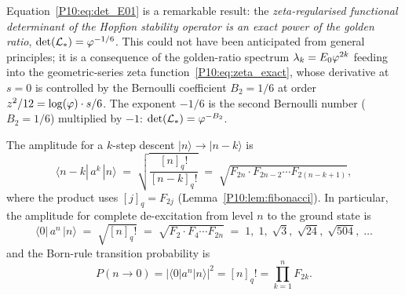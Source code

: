 \begin{remark}
\label{P10:rem:golden_functional_det}
Equation~\eqref{P10:eq:det_E01} is a remarkable result: the
\emph{zeta-regularised functional determinant of the Hopfion
stability operator is an exact power of the golden ratio},
$\det(\mathcal{L}_*) = \varphi^{-1/6}$.
This could not have been anticipated from general principles;
it is a consequence of the golden-ratio spectrum $\lambda_k = E_0\varphi^{2k}$
feeding into the geometric-series zeta function~\eqref{P10:eq:zeta_exact},
whose derivative at $s=0$ is controlled by the Bernoulli coefficient
$B_2 = 1/6$ at order $z^2/12 = \log(\varphi)\cdot s/6$.
The exponent $-1/6$ is the second Bernoulli number
($B_2 = 1/6$) multiplied by $-1$: $\det(\mathcal{L}_*) = \varphi^{-B_2}$.
\end{remark}

\begin{corollary}
\label{P10:cor:amplitudes}
The amplitude for a $k$-step descent $|n\rangle\to|n-k\rangle$ is
\begin{equation}
  \boxed{\langle n-k|\,a^k\,|n\rangle
  \;=\; \sqrt{\frac{[n]_q!}{[n-k]_q!}}
  \;=\; \sqrt{F_{2n}\cdot F_{2n-2}\cdots F_{2(n-k+1)}}},
  \label{P10:eq:amplitude}
\end{equation}
where the product uses $[j]_q = F_{2j}$ (Lemma~\ref{P10:lem:fibonacci}).
In particular, the amplitude for complete de-excitation from level $n$
to the ground state is
\begin{equation}
  \langle 0|\,a^n\,|n\rangle
  \;=\; \sqrt{[n]_q!}
  \;=\; \sqrt{F_2\cdot F_4\cdots F_{2n}}
  \;=\; 1,\;1,\;\sqrt{3},\;\sqrt{24},\;\sqrt{504},\;\ldots
  \label{P10:eq:full_deexcitation}
\end{equation}
and the Born-rule transition probability is
\begin{equation}
  P(n\to 0) = |\langle 0|a^n|n\rangle|^2
  = [n]_q! = \prod_{k=1}^n F_{2k}.
  \label{P10:eq:prob_n0}
\end{equation}
\end{corollary}

